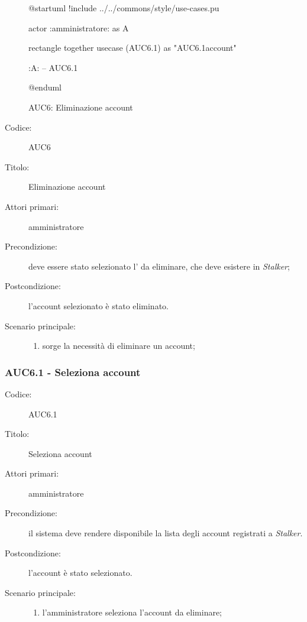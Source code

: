 \documentclass[../../../analisi-dei-requisiti.tex]{subfiles}
\begin{document}
\begin{figure}[h!]
  \centering
  \begin{plantuml}
  @startuml
  !include ../../commons/style/use-cases.pu

  actor :amministratore: as A

  rectangle {
    together {
      usecase (AUC6.1) as "AUC6.1\nSeleziona account"
    }
  }

  :A: -- AUC6.1

  @enduml
  \end{plantuml}
  \caption{AUC6: Eliminazione account}
  \label{fig:auc6}
\end{figure}

\begin{description}
  \item[Codice:] AUC6
  \item[Titolo:] Eliminazione account
  \item[Attori primari:] amministratore
  \item[Precondizione:] deve essere stato selezionato l' da eliminare, che deve esistere in \emph{Stalker};
  \item[Postcondizione:] l'account selezionato è stato eliminato.
  \item[Scenario principale:]
  \begin{enumerate}
    \item sorge la necessità di eliminare un account;
  \end{enumerate}
\end{description}

\subsubsection{AUC6.1 - Seleziona account}%
\label{subs:AUC6.1}
\begin{description}
  \item[Codice:] AUC6.1
  \item[Titolo:] Seleziona account
  \item[Attori primari:] amministratore
  \item[Precondizione:] il sistema deve rendere disponibile la lista degli account registrati a \emph{Stalker}.
  \item[Postcondizione:] l'account è stato selezionato.
  \item[Scenario principale:]
  \begin{enumerate}
    \item l'amministratore seleziona l'account da eliminare;
  \end{enumerate}
\end{description}
\end{document}
